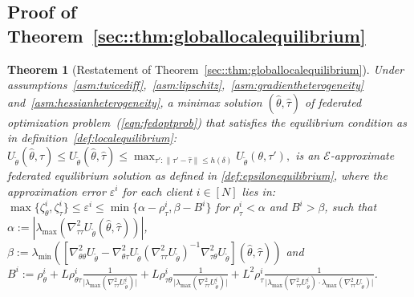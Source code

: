 \documentclass{article}
\newtheorem{theorem}{Theorem}%
\theoremstyle{definition}
\begin{document}
\subsection{Proof of Theorem~\ref{sec::thm:globallocalequilibrium}}
\label{ap::thm:globallocalequilibrium}
\begin{theorem}[Restatement of Theorem~\ref{sec::thm:globallocalequilibrium}]
	Under assumptions~\ref{asm:twicediff},~\ref{asm:lipschitz},~\ref{asm:gradientheterogeneity} and~\ref{asm:hessianheterogeneity}, a minimax solution $(\hat\theta,\hat\tau)$ of federated optimization problem~(\ref{eqn:fedoptprob}) that satisfies the equilibrium condition as in definition~\ref{def:localequilibrium}: 
		$
		U_{\tilde\theta}(\hat\theta,\tau)\leq U_{\tilde\theta}(\hat\theta,\hat\tau)\leq \max_{{\tau\prime : \|\tau\prime-\hat\tau\|\leq h(\delta)}}U_{\tilde\theta}(\theta,\tau\prime),
		$
	is an $\mathcal{E}$-approximate federated equilibrium solution as defined in \ref{def:epsilonequilibrium}, where the approximation error $\varepsilon^i$ for each client $i\in[N]$ lies in:
	$ \max\{ \zeta_{\theta}^i, \zeta_{\tau}^i\}\le \varepsilon^i\le \min\{\alpha-\rho_{\tau}^i,\beta- B^i \}    
	$
	for $\rho_{\tau}^i<\alpha$ and $B^i>\beta$, such that $\alpha:=\left\vert\lambda_{\max}\left(\nabla_{\tau\tau}^2U_{\tilde\theta}(\hat\theta,\hat\tau)\right)\right\vert$, $\beta:=\lambda_{\min}\left(\left[\nabla_{\theta\theta}^2U_{\tilde\theta}-\nabla_{\theta\tau}^2U_{\tilde\theta}\left(\nabla_{\tau\tau}^2U_{\tilde\theta}\right)^{-1}\nabla_{\tau\theta}^2U_{\tilde\theta}\right](\hat\theta,\hat\tau)\right)$ and $B^i:=\rho_{\theta}^i+ L\rho_{\theta\tau}^i\frac{1}{\vert\lambda_{\max}(\nabla_{\tau\tau}^2 U_{\tilde\theta}^i)\vert}+L\rho_{\tau\theta}^i\frac{1}{\vert\lambda_{\max}(\nabla_{\tau\tau}^2 U_{\tilde\theta}^i)\vert}+ L^2\rho_{\tau}^i\frac{1}{\vert\lambda_{\max}(\nabla_{\tau\tau}^2 U_{\tilde\theta}^i)\cdot\lambda_{\max}(\nabla_{\tau\tau}^2 U_{\tilde\theta})\vert}$.
\end{theorem}
\end{document}
